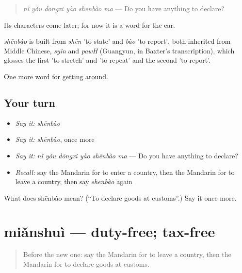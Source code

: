\begin{quote}
\emph{nǐ yǒu dōngxi yào shēnbào ma} — Do you have anything to declare?
\end{quote}

Its characters come later; for now it is a word for the ear.

\begin{cousinweb}
\emph{shēnbào} is built from \emph{shēn} 'to state' and \emph{bào} 'to report', both inherited from Middle Chinese, \emph{syin} and \emph{pawH} (Guangyun, in Baxter's transcription), which glosses the first 'to stretch' and 'to repeat' and the second 'to report'.
\end{cousinweb}

\begin{grammarlens}[title={What you've built}]
One more word for getting around.
\end{grammarlens}

\subsection*{Your turn}
\begin{itemize}
\raggedright
  \item \emph{Say it:} \emph{shēnbào}
  \item \emph{Say it:} \emph{shēnbào}, once more
  \item \emph{Say it:} \emph{nǐ yǒu dōngxi yào shēnbào ma} — Do you have anything to declare?
  \item \emph{Recall:} say the Mandarin for to enter a country, then the Mandarin for to leave a country, then say \emph{shēnbào} again
\end{itemize}

\begin{tcolorbox}[breakable,colback=teal!4,colframe=teal!35!black,title={Before you move on}]
What does shēnbào mean? (\textquotedblleft{}To declare goods at customs\textquotedblright{}.) Say it once more.
\end{tcolorbox}
\section[miǎnshuì]{miǎnshuì — duty-free; tax-free}

\label{lesson:ZH-C417-mianshui}



\begin{quote}
Before the new one: say the Mandarin for to leave a country, then the Mandarin for to declare goods at customs.
\end{quote}

